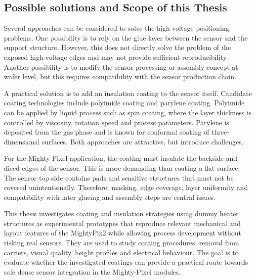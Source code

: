 \subsection{Possible solutions and Scope of this Thesis}
Several approaches can be considered to solve the high-voltage positioning problems. One possibility is to rely on the glue layer between the sensor and the support structure. However, this does not directly solve the problem of the exposed high-voltage edges and may not provide sufficient reproducibility. Another possibility is to modify the sensor processing or assembly concept at wafer level, but this requires compatibility with the sensor production chain.\par
A practical solution is to add an insulation coating to the sensor itself. Candidate coating technologies include polyimide coating and parylene coating. Polyimide can be applied by liquid process such as spin coating, where the layer thickness is controlled by viscosity, rotation speed and process parameters. Parylene is deposited from the gas phase and is known for conformal coating of three-dimensional surfaces. Both approaches are attractive, but introduce challenges.\par
For the Mighty-Pixel application, the coating must insulate the backside and diced edges of the sensor. This is more demanding than coating a flat surface. The sensor top side contains pads and sensitive structures that must not be covered unintentionally. Therefore, masking, edge coverage, layer uniformity and compatibility with later glueing and assembly steps are central issues.\par
This thesis investigates coating and insulation strategies using dummy heater structures as experimental prototypes that reproduce relevant mechanical and layout features of the MightyPix2 while allowing process development without risking real sensors. They are used to study coating procedures, removal from carriers, visual quality, height profiles and electrical behaviour. The goal is to evaluate whether the investigated coatings can provide a practical route towards safe dense sensor integration in the Mighty-Pixel modules.
